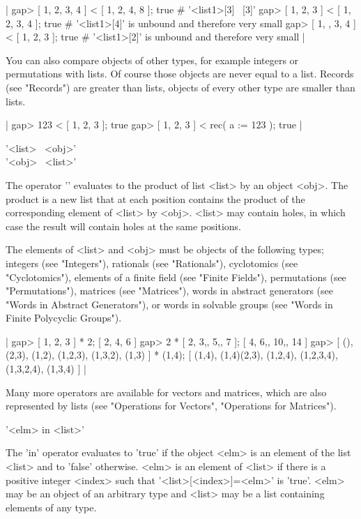 |    gap> [ 1, 2, 3, 4 ] < [ 1, 2, 4, 8 ];
    true    # '<list1>[3] \<\ <list2>[3]'
    gap> [ 1, 2, 3 ] < [ 1, 2, 3, 4 ];
    true    # '<list1>[4]' is unbound and therefore very small
    gap> [ 1, , 3, 4 ] < [ 1, 2, 3 ];
    true    # '<list1>[2]' is unbound and therefore very small |

You  can also compare  objects of other  types, for  example integers  or
permutations with  lists.  Of course  those objects are never equal  to a
list.  Records (see "Records") are greater  than lists,  objects of every
other type are smaller than lists.

|    gap> 123 < [ 1, 2, 3 ];
    true
    gap> [ 1, 2, 3 ] < rec( a := 123 );
    true |

%

'<list> \*\ <obj>'\\
'<obj> \*\ <list>'

The operator '\*'  evaluates to the product  of list <list> by  an object
<obj>.  The product  is a  new list that   at each position contains  the
product of  the corresponding element  of  <list> by  <obj>.  <list>  may
contain holes,  in which case  the result will contain  holes at the same
positions.

The elements of <list> and <obj> must be  objects of the following types;
integers (see "Integers"), rationals  (see "Rationals"), cyclotomics (see
"Cyclotomics"),   elements  of a  finite  field  (see  "Finite  Fields"),
permutations  (see "Permutations"), matrices   (see "Matrices"), words in
abstract  generators (see  "Words in  Abstract Generators"), or  words in
solvable groups (see "Words in Finite Polycyclic Groups").

|    gap> [ 1, 2, 3 ] * 2;
    [ 2, 4, 6 ]
    gap> 2 * [ 2, 3,, 5,, 7 ];
    [ 4, 6,, 10,, 14 ]
    gap> [ (), (2,3), (1,2), (1,2,3), (1,3,2), (1,3) ] * (1,4);
    [ (1,4), (1,4)(2,3), (1,2,4), (1,2,3,4), (1,3,2,4), (1,3,4) ] |

Many more operators are  available for  vectors and  matrices,  which are
also represented by lists (see "Operations  for Vectors", "Operations for
Matrices").

%

'<elm> in <list>'

The 'in' operator evaluates  to 'true' if the object  <elm> is an element
of  the  list <list> and  to 'false'  otherwise.  <elm> is  an element of
<list>    if there   is   a     positive  integer   <index>  such    that
'<list>[<index>]=<elm>' is  'true'.     <elm>  may be an  object    of an
arbitrary type and <list> may be a list containing elements of any type.

